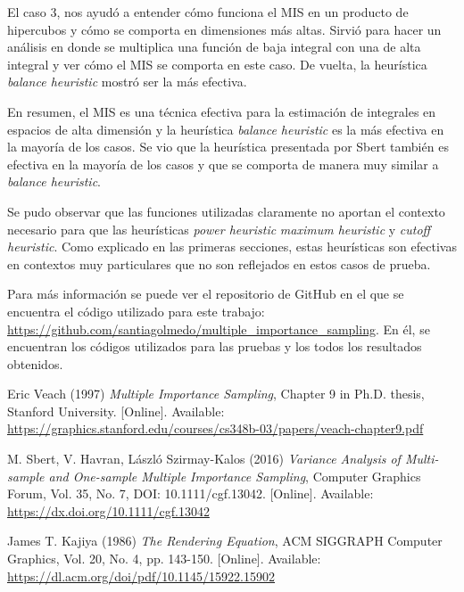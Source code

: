 \documentclass{article}
\begin{document}
El caso 3, nos ayudó a entender cómo funciona el MIS en un producto de hipercubos y cómo se comporta en dimensiones más altas.
Sirvió para hacer un análisis en donde se multiplica una función de baja integral con una de alta integral y ver cómo el MIS se comporta en este caso.
De vuelta, la heurística \textit{balance heuristic} mostró ser la más efectiva.

En resumen, el MIS es una técnica efectiva para la estimación de integrales en espacios de alta dimensión y la heurística \textit{balance heuristic} es la más efectiva en la mayoría de los casos.
Se vio que la heurística presentada por Sbert también es efectiva en la mayoría de los casos y que se comporta de manera muy similar a \textit{balance heuristic}.

Se pudo observar que las funciones utilizadas claramente no aportan el contexto necesario para que las heurísticas \textit{power heuristic} \textit{maximum heuristic} y \textit{cutoff heuristic}.
Como explicado en las primeras secciones, estas heurísticas son efectivas en contextos muy particulares que no son reflejados en estos casos de prueba.

Para más información se puede ver el repositorio de GitHub en el que se encuentra el código utilizado para este trabajo: \url{https://github.com/santiagolmedo/multiple_importance_sampling}.
En él, se encuentran los códigos utilizados para las pruebas y los todos los resultados obtenidos.

\begin{thebibliography}{99}

Eric Veach (1997) \emph{Multiple Importance Sampling}, Chapter 9 in Ph.D. thesis, Stanford University. [Online]. Available: \url{https://graphics.stanford.edu/courses/cs348b-03/papers/veach-chapter9.pdf}

M. Sbert, V. Havran, László Szirmay-Kalos (2016) \emph{Variance Analysis of Multi-sample and One-sample Multiple Importance Sampling}, Computer Graphics Forum, Vol. 35, No. 7, DOI: 10.1111/cgf.13042. [Online]. Available: \url{https://dx.doi.org/10.1111/cgf.13042}

James T. Kajiya (1986) \emph{The Rendering Equation}, ACM SIGGRAPH Computer Graphics, Vol. 20, No. 4, pp. 143-150. [Online]. Available: \url{https://dl.acm.org/doi/pdf/10.1145/15922.15902}

\end{thebibliography}
\end{document}
